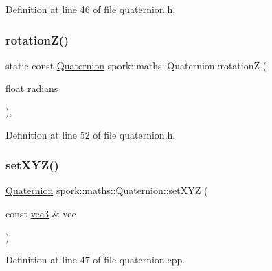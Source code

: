 Definition at line 46 of file quaternion.\+h.

\mbox{\label{structspork_1_1maths_1_1_quaternion_a6d63a4fce870d6eebfe41bce244a6123}} 
\subsubsection{\texorpdfstring{rotation\+Z()}{rotationZ()}}
{\footnotesize\ttfamily static const \hyperlink{structspork_1_1maths_1_1_quaternion}{Quaternion} spork\+::maths\+::\+Quaternion\+::rotationZ (\begin{DoxyParamCaption}\item[{float}]{radians }\end{DoxyParamCaption})\hspace{0.3cm}{\ttfamily [inline]}, {\ttfamily [static]}}



Definition at line 52 of file quaternion.\+h.

\mbox{\label{structspork_1_1maths_1_1_quaternion_a99c40c3adaa208ca18844873caf57266}} 
\subsubsection{\texorpdfstring{set\+X\+Y\+Z()}{setXYZ()}}
{\footnotesize\ttfamily \hyperlink{structspork_1_1maths_1_1_quaternion}{Quaternion} spork\+::maths\+::\+Quaternion\+::set\+X\+YZ (\begin{DoxyParamCaption}\item[{const \hyperlink{structspork_1_1maths_1_1vec3}{vec3} \&}]{vec }\end{DoxyParamCaption})}



Definition at line 47 of file quaternion.\+cpp.

\mbox{\label{structspork_1_1maths_1_1_quaternion_acc590420b3df4273167e59f5d380890f}} 
